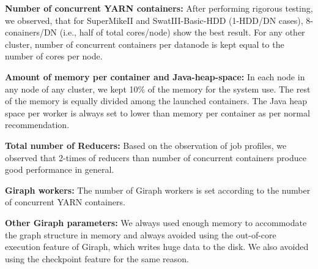 \documentclass[conference]{IEEEtran}
\begin{document}
\textbf{Number of concurrent YARN containers:} After performing rigorous testing,  we observed, that for SuperMikeII and SwatIII-Basic-HDD (1-HDD/DN cases), 8-conainers/DN (i.e., half of total cores/node) show the best result. For any other cluster, number of concurrent containers per datanode is kept equal to the number of cores per node. 

\textbf{Amount of memory per container and Java-heap-space:} In each node in any node of any cluster, we kept 10\% of the memory for the system use. The rest of the memory is equally divided among the launched containers. The Java heap space per worker is always set to lower than memory per container as per normal recommendation.

\textbf{Total number of Reducers:} Based on the observation of job profiles, we observed that 2-times of reducers than number of concurrent containers produce good performance in general. 

\textbf{Giraph workers:} The number of Giraph workers is set according to the number of concurrent YARN containers.

\textbf{Other Giraph parameters:} We always used enough memory to accommodate the graph structure in memory and always avoided using the out-of-core execution feature of Giraph, which writes huge data to the disk. We also avoided using the checkpoint feature for the same reason.
\end{document}
